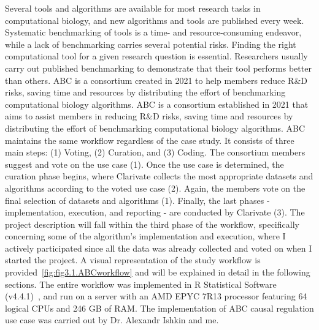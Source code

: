 Several tools and algorithms are available for most research tasks in computational biology, and new algorithms and tools are published every week.
Systematic benchmarking of tools is a time- and resource-consuming endeavor, while a lack of benchmarking carries several potential risks.
Finding the right computational tool for a given research question is essential.
Researchers usually carry out published benchmarking to demonstrate that their tool performs better than others. \gls{ABC} is a consortium created in 2021 to help members reduce R\&D risks, saving time and resources by distributing the effort of benchmarking computational biology algorithms. \gls{ABC} is a consortium established in 2021 that aims to assist members in reducing R\&D risks, saving time and resources by distributing the effort of benchmarking computational biology algorithms. \gls{ABC} maintains the same workflow regardless of the case study. It consists of three main steps: (1) Voting, (2) Curation, and (3) Coding. The consortium members suggest and vote on the use case (1). Once the use case is determined, the curation phase begins, where Clarivate collects the most appropriate datasets and algorithms according to the voted use case (2). Again, the members vote on the final selection of datasets and algorithms (1). Finally, the last phases - implementation, execution, and reporting - are conducted by Clarivate (3). 
The project description will fall within the third phase of the workflow, specifically concerning some of the algorithm's implementation and execution, where I actively participated since all the data was already collected and voted on when I started the project.
A visual representation of the study workflow is provided~\ref{fig:fig3.1.ABCworkflow} and will be explained in detail in the following sections.
The entire workflow was implemented in \gls{R} Statistical Software (v4.4.1)~\cite{RN159}, and run on a server with an AMD EPYC 7R13 processor featuring 64 logical CPUs and 246 GB of RAM.
The implementation of \gls{ABC} causal regulation use case was carried out by Dr. Alexandr Ishkin and me.

